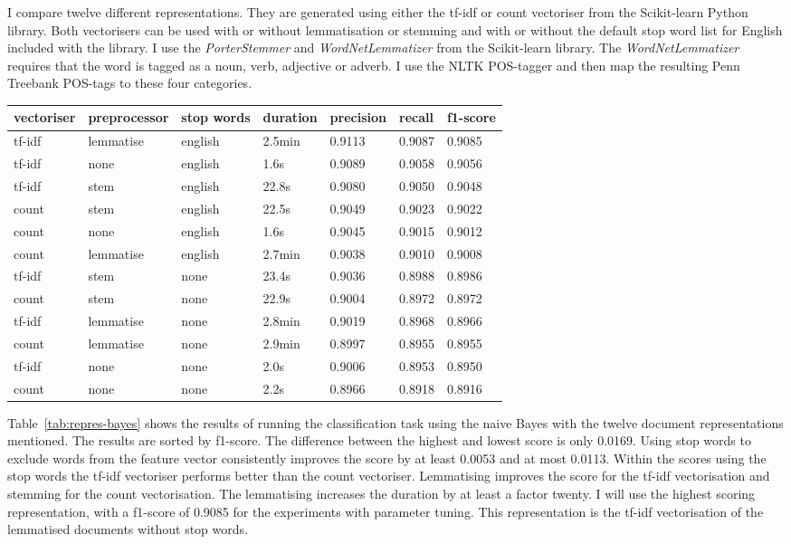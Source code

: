 \documentclass[11pt]{article}
\begin{document}
I compare twelve different representations. They are generated using either the tf-idf or count vectoriser from the Scikit-learn Python library. Both vectorisers can be used with or without lemmatisation or stemming and with or without the default stop word list for English included with the library. I use the \emph{PorterStemmer} and \emph{WordNetLemmatizer} from the Scikit-learn library. The \emph{WordNetLemmatizer} requires that the word is tagged as a noun, verb, adjective or adverb. I use the NLTK POS-tagger and then map the resulting Penn Treebank POS-tags to these four categories.

\begin{table*}[ht]\footnotesize
\centering
\begin{tabular}{ l l l l l l l }
vectoriser & preprocessor & stop words & duration & precision & recall & f1-score \\
\hline
tf-idf & lemmatise & english & 2.5min & 0.9113 & 0.9087 & 0.9085 \\
tf-idf & none & english & 1.6s & 0.9089 & 0.9058 & 0.9056 \\
tf-idf & stem & english & 22.8s & 0.9080 & 0.9050 & 0.9048 \\
count & stem & english & 22.5s & 0.9049 & 0.9023 & 0.9022 \\
count & none & english & 1.6s & 0.9045 & 0.9015 & 0.9012 \\
count & lemmatise & english & 2.7min & 0.9038 & 0.9010 & 0.9008 \\
tf-idf & stem & none & 23.4s & 0.9036 & 0.8988 & 0.8986 \\
count & stem & none & 22.9s & 0.9004 & 0.8972 & 0.8972 \\
tf-idf & lemmatise & none & 2.8min & 0.9019 & 0.8968 & 0.8966 \\
count & lemmatise & none & 2.9min & 0.8997 & 0.8955 & 0.8955 \\
tf-idf & none & none & 2.0s & 0.9006 & 0.8953 & 0.8950 \\
count & none & none & 2.2s & 0.8966 & 0.8918 & 0.8916 \\
\end{tabular}
\caption{scores for different representations and the naive Bayes classifier sorted by f1-score}
\label{tab:repres-bayes}
\end{table*}

Table~\ref{tab:repres-bayes} shows the results of running the classification task using the naive Bayes with the twelve document representations mentioned. The results are sorted by f1-score. The difference between the highest and lowest score is only 0.0169. Using stop words to exclude words from the feature vector consistently improves the score by at least 0.0053 and at most 0.0113. Within the scores using the stop words the tf-idf vectoriser performs better than the count vectoriser. Lemmatising improves the score for the tf-idf vectorisation and stemming for the count vectorisation. The lemmatising increases the duration by at least a factor twenty. I will use the highest scoring representation, with a f1-score of 0.9085 for the experiments with parameter tuning. This representation is the tf-idf vectorisation of the lemmatised documents without stop words.
\end{document}
